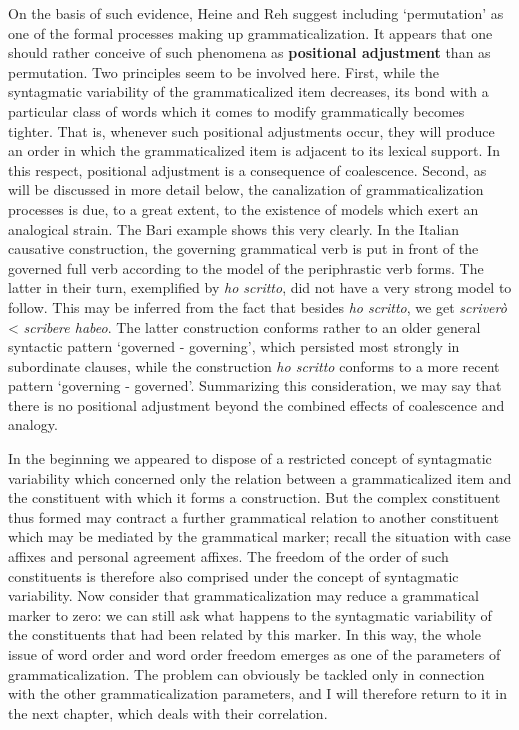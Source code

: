 On the basis of such evidence, Heine and Reh suggest including ‘permutation’ as one of the formal processes making up grammaticalization. It appears that one should rather conceive of such phenomena as \textbf{positional adjustment} than as permutation. Two principles seem to be involved here. First, while the syntagmatic variability of the grammaticalized item decreases, its bond with a particular class of words which it comes to modify grammatically becomes tighter. That is, whenever such positional adjustments occur, they will produce an order in which the grammaticalized item is adjacent to its lexical support. In this respect, positional adjustment is a consequence of coalescence. Second, as will be discussed in more detail below, the canalization of grammaticalization processes is due, to a great extent, to the existence of models which exert an analogical strain. The Bari example shows this very clearly. In the Italian causative construction, the governing grammatical verb is put in front of the governed full verb according to the model of the periphrastic verb forms. The latter in their turn, exemplified by \textit{ho scritto}, did not have a very strong model to follow. This may be inferred from the fact that besides \textit{ho scritto}, we get \textit{scriverò} {\textless} \textit{scribere habeo}. The latter construction conforms rather to an older general syntactic pattern ‘governed - governing’, which persisted most strongly in subordinate clauses, while the construction \textit{ho scritto} conforms to a more recent pattern ‘governing - governed’. Summarizing this consideration, we may say that there is no positional adjustment beyond the combined effects of coalescence and analogy.%

In the beginning we appeared to dispose of a restricted concept of syntagmatic variability which concerned only the relation between a grammaticalized item and the constituent with which it forms a construction. But the complex constituent thus formed may contract a further grammatical relation to another constituent which may be mediated by the grammatical marker; recall the situation with case affixes and personal agreement affixes. The freedom of the order of such constituents is therefore also comprised under the concept of syntagmatic variability. Now consider that grammaticalization may reduce a grammatical marker to zero: we can still ask what happens to the syntagmatic variability of the constituents that had been related by this marker. In this way, the whole issue of word order and word order freedom emerges as one of the parameters of grammaticalization. The problem can obviously be tackled only in connection with the other grammaticalization parameters, and I will therefore return to it in the next chapter, which deals with their correlation.

